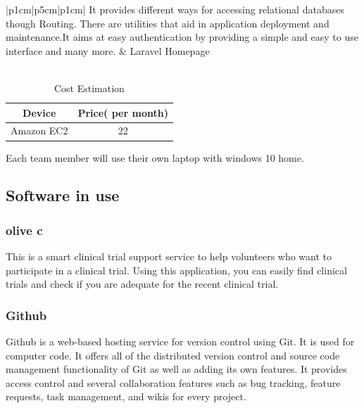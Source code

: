 \documentclass[letterpaper, 10 pt, conference]{ieeeconf}  %
\begin{document}
\begin{supertabular}{ |p{1cm}|p{5cm}|p{1cm}|  }
It provides different ways for accessing relational databases though Routing.
There are utilities that aid in application deployment and maintenance.It aims at easy authentication by providing a simple and easy to use interface and many more. & Laravel Homepage\\
\hline
{}\\
\hline
\end{supertabular}



\begin{table}[h]
\caption{Cost Estimation}
\label{table_example}
\begin{center}
\begin{tabular}{|c||c|}
\hline
Device & Price( per month)\\
\hline
Amazon EC2 & 22\\
\hline
\end{tabular}
\end{center}
\end{table}


Each team member will use their own laptop with windows 10 home. 

\subsection{Software in use}
\subsubsection{olive c}
This is a smart clinical trial support service to help volunteers who want to participate in a clinical trial. Using this application, you can easily find clinical trials and check if you are adequate for the recent clinical trial.
\subsubsection{Github}
Github is a web-based hosting service for version control using Git. It is used for computer code. It offers all of the distributed version control and source code management functionality of Git as well as adding its own features. It provides access control and several collaboration features such as bug tracking, feature requests, task management, and wikis for every project.\\
\end{document}
